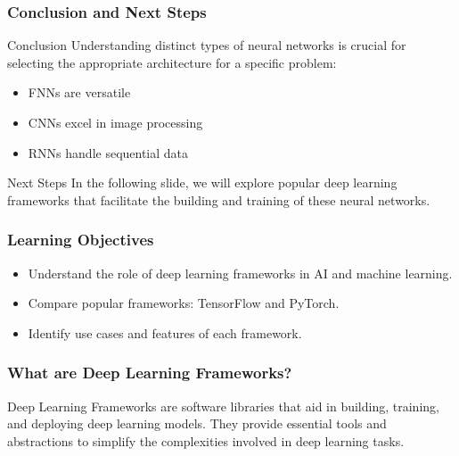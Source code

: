 \documentclass[aspectratio=169]{beamer}
\begin{document}
\begin{frame}[fragile]
    \frametitle{Conclusion and Next Steps}
    \begin{block}{Conclusion}
        Understanding distinct types of neural networks is crucial for selecting the appropriate architecture for a specific problem:
        \begin{itemize}
            \item FNNs are versatile
            \item CNNs excel in image processing
            \item RNNs handle sequential data
        \end{itemize}
    \end{block}
    \begin{block}{Next Steps}
        In the following slide, we will explore popular deep learning frameworks that facilitate the building and training of these neural networks.
    \end{block}
\end{frame}

\begin{frame}
    \frametitle{Learning Objectives}
    \begin{itemize}
        \item Understand the role of deep learning frameworks in AI and machine learning.
        \item Compare popular frameworks: TensorFlow and PyTorch.
        \item Identify use cases and features of each framework.
    \end{itemize}
\end{frame}

\begin{frame}
    \frametitle{What are Deep Learning Frameworks?}
    Deep Learning Frameworks are software libraries that aid in building, training, 
    and deploying deep learning models. They provide essential tools and abstractions 
    to simplify the complexities involved in deep learning tasks.
\end{frame}
\end{document}
